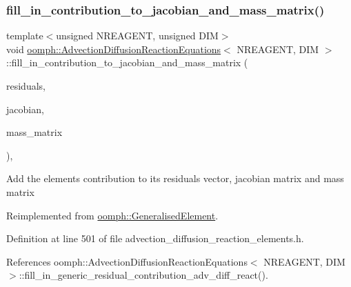 \subsubsection{\texorpdfstring{fill\+\_\+in\+\_\+contribution\+\_\+to\+\_\+jacobian\+\_\+and\+\_\+mass\+\_\+matrix()}{fill\_in\_contribution\_to\_jacobian\_and\_mass\_matrix()}}
{\footnotesize\ttfamily template$<$unsigned N\+R\+E\+A\+G\+E\+NT, unsigned D\+IM$>$ \\
void \hyperlink{classoomph_1_1AdvectionDiffusionReactionEquations}{oomph\+::\+Advection\+Diffusion\+Reaction\+Equations}$<$ N\+R\+E\+A\+G\+E\+NT, D\+IM $>$\+::fill\+\_\+in\+\_\+contribution\+\_\+to\+\_\+jacobian\+\_\+and\+\_\+mass\+\_\+matrix (\begin{DoxyParamCaption}\item[{\hyperlink{classoomph_1_1Vector}{Vector}$<$ double $>$ \&}]{residuals,  }\item[{\hyperlink{classoomph_1_1DenseMatrix}{Dense\+Matrix}$<$ double $>$ \&}]{jacobian,  }\item[{\hyperlink{classoomph_1_1DenseMatrix}{Dense\+Matrix}$<$ double $>$ \&}]{mass\+\_\+matrix }\end{DoxyParamCaption})\hspace{0.3cm}{\ttfamily [inline]}, {\ttfamily [virtual]}}

Add the element\textquotesingle{}s contribution to its residuals vector, jacobian matrix and mass matrix 

Reimplemented from \hyperlink{classoomph_1_1GeneralisedElement_a2b6294a730647cf865da94f2531466f8}{oomph\+::\+Generalised\+Element}.



Definition at line 501 of file advection\+\_\+diffusion\+\_\+reaction\+\_\+elements.\+h.



References oomph\+::\+Advection\+Diffusion\+Reaction\+Equations$<$ N\+R\+E\+A\+G\+E\+N\+T, D\+I\+M $>$\+::fill\+\_\+in\+\_\+generic\+\_\+residual\+\_\+contribution\+\_\+adv\+\_\+diff\+\_\+react().

\mbox{\label{classoomph_1_1AdvectionDiffusionReactionEquations_a0cf72be1f384151d58b26ced55b1ade0}} 
